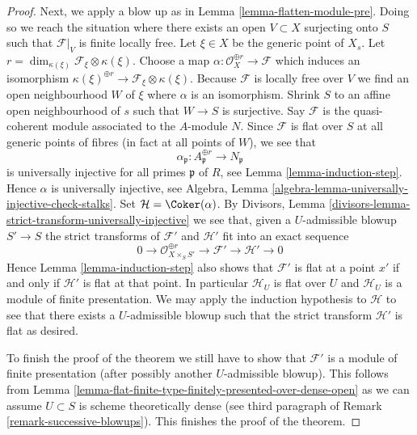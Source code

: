 \begin{proof}
\medskip\noindent
Next, we apply a blow up as in Lemma \ref{lemma-flatten-module-pre}.
Doing so we reach the situation where there exists an
open $V \subset X$ surjecting onto $S$ such that $\mathcal{F}|_V$
is finite locally free. Let $\xi \in X$ be the generic point of $X_s$. Let
$r = \dim_{\kappa(\xi)} \mathcal{F}_\xi \otimes \kappa(\xi)$.
Choose a map $\alpha : \mathcal{O}_X^{\oplus r} \to \mathcal{F}$
which induces an isomorphism
$\kappa(\xi)^{\oplus r} \to \mathcal{F}_\xi \otimes \kappa(\xi)$.
Because $\mathcal{F}$ is locally free over $V$ we find an open neighbourhood
$W$ of $\xi$ where $\alpha$ is an isomorphism. Shrink $S$ to an affine open
neighbourhood of $s$ such that $W \to S$ is surjective. Say $\mathcal{F}$
is the quasi-coherent module associated to the $A$-module $N$. Since
$\mathcal{F}$ is flat over $S$ at all generic points of fibres
(in fact at all points of $W$), we see that
$$
\alpha_\mathfrak p : A_\mathfrak p^{\oplus r} \to N_\mathfrak p
$$
is universally injective for all primes $\mathfrak p$ of $R$, see
Lemma \ref{lemma-induction-step}. Hence $\alpha$ is universally injective,
see Algebra, Lemma \ref{algebra-lemma-universally-injective-check-stalks}.
Set $\mathcal{H} = \Coker(\alpha)$.
By Divisors, Lemma \ref{divisors-lemma-strict-transform-universally-injective}
we see that, given a $U$-admissible blowup $S' \to S$
the strict transforms of $\mathcal{F}'$ and $\mathcal{H}'$
fit into an exact sequence
$$
0 \to \mathcal{O}_{X \times_S S'}^{\oplus r} \to \mathcal{F}'
\to \mathcal{H}' \to 0
$$
Hence Lemma \ref{lemma-induction-step} also shows that $\mathcal{F}'$
is flat at a point $x'$ if and only if
$\mathcal{H}'$ is flat at that point. In particular $\mathcal{H}_U$ is
flat over $U$ and $\mathcal{H}_U$ is a module of finite presentation.
We may apply the induction hypothesis to $\mathcal{H}$ to see that
there exists a $U$-admissible blowup such that the strict transform
$\mathcal{H}'$ is flat as desired.

\medskip\noindent
To finish the proof of the theorem we still have to show that $\mathcal{F}'$
is a module of finite presentation (after possibly another
$U$-admissible blowup). This follows from
Lemma \ref{lemma-flat-finite-type-finitely-presented-over-dense-open}
as we can assume $U \subset S$ is scheme theoretically dense (see
third paragraph of Remark \ref{remark-successive-blowups}).
This finishes the proof of the theorem.
\end{proof}





